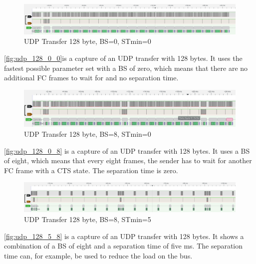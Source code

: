 \newpage

\begin{figure}[htp]
        \begin{center}
                \includegraphics[width=\textwidth]{figures/eval_128_0_0.png}
        \end{center}
        \caption{UDP Transfer 128 byte, BS=0, STmin=0}
        \label{fig:udp_128_0_0}
\end{figure}

\autoref{fig:udp_128_0_0}is a capture of an UDP transfer with 128 bytes.
It uses the fastest possible parameter set with a BS of zero, which means that there are no additional FC frames to wait for and no separation time.

\begin{figure}[htp]
        \begin{center}
                \includegraphics[width=\textwidth]{figures/eval_128_0_8.png}
        \end{center}
        \caption{UDP Transfer 128 byte, BS=8, STmin=0}
        \label{fig:udp_128_0_8}
\end{figure}

\autoref{fig:udp_128_0_8} is a capture of an UDP transfer with 128 bytes.
It uses a BS of eight, which means that every eight frames, the sender has to wait for another FC frame with a CTS state. The separation time is zero.

\begin{figure}[htp]
        \begin{center}
                \includegraphics[width=\textwidth]{figures/eval_128_5_8.png}
        \end{center}
        \caption{UDP Transfer 128 byte, BS=8, STmin=5}
        \label{fig:udp_128_5_8}
\end{figure}

\autoref{fig:udp_128_5_8} is a capture of an UDP transfer with 128 bytes.
It shows a combination of a BS of eight and a separation time of five ms.
The separation time can, for example, be used to reduce the load on the bus.

